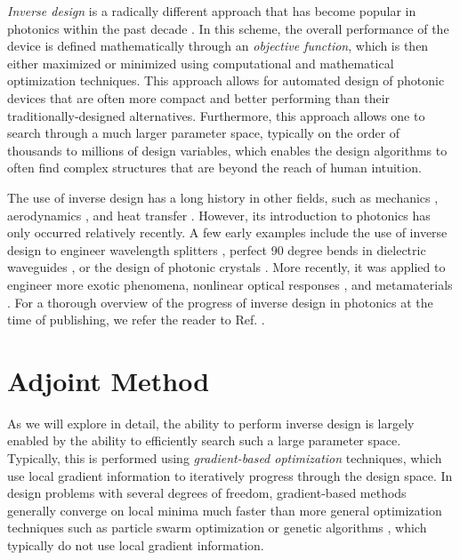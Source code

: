 \textit{Inverse design} is a radically different approach that has become popular in photonics within the past decade \cite{molesky_inverse_2018}.  
In this scheme, the overall performance of the device is defined mathematically through an \textit{objective function}, which is then either maximized or minimized using computational and mathematical optimization techniques.
This approach allows for automated design of photonic devices that are often more compact and better performing than their traditionally-designed alternatives.
Furthermore, this approach allows one to search through a much larger parameter space, typically on the order of thousands to millions of design variables, which enables the design algorithms to often find complex structures that are beyond the reach of human intuition.

The use of inverse design has a long history in other fields, such as mechanics \cite{tanaka_inverse_1998}, aerodynamics \cite{jameson_aerodynamic_nodate}, and heat transfer \cite{ozisik_inverse_2018}.
However, its introduction to photonics has only occurred relatively recently.
A few early examples include the use of inverse design to engineer wavelength splitters \cite{piggott_inverse_2015}, perfect 90 degree bends in dielectric waveguides \cite{jensen_topology_2005}, or the design of photonic crystals \cite{borel_topology_2004}.
More recently, it was applied to engineer more exotic phenomena, nonlinear optical responses \cite{lin_cavity-enhanced_2016}, and metamaterials \cite{sigmund_systematic_2009}.
For a thorough overview of the progress of inverse design in photonics at the time of publishing, we refer the reader to Ref. .

\section{Adjoint Method}

As we will explore in detail, the ability to perform inverse design is largely enabled by the ability to efficiently search such a large parameter space.
Typically, this is performed using \textit{gradient-based optimization} techniques, which use local gradient information to iteratively progress through the design space.
In design problems with several degrees of freedom, gradient-based methods generally converge on local minima much faster than more general optimization techniques such as particle swarm optimization \cite{noauthor_particle_nodate} or genetic algorithms \cite{whitley_genetic_1994}, which typically do not use local gradient information.

